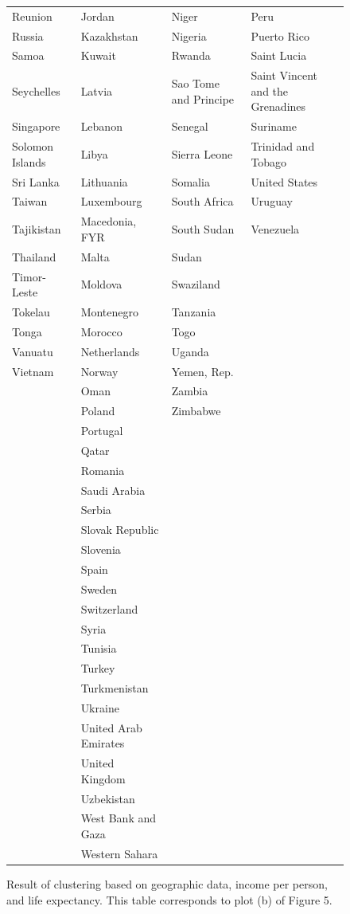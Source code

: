 \documentclass[11pt]{amsart}
\theoremstyle{remark}	  \newtheorem*{remark}{Remark}
\numberwithin{equation}{section}
\begin{document}
\begin{figure}[b]
\begin{tabular}{|l|l|l|l|}
Reunion&Jordan&Niger&Peru\\
Russia&Kazakhstan&Nigeria&Puerto Rico\\
Samoa&Kuwait&Rwanda&Saint Lucia\\
Seychelles&Latvia&Sao Tome and Principe&Saint Vincent and the Grenadines\\
Singapore&Lebanon&Senegal&Suriname\\
Solomon Islands&Libya&Sierra Leone&Trinidad and Tobago\\
Sri Lanka&Lithuania&Somalia&United States\\
Taiwan&Luxembourg&South Africa&Uruguay\\
Tajikistan&Macedonia, FYR&South Sudan&Venezuela\\
Thailand&Malta&Sudan&\\
Timor-Leste&Moldova&Swaziland&\\
Tokelau&Montenegro&Tanzania&\\
Tonga&Morocco&Togo&\\
Vanuatu&Netherlands&Uganda&\\
Vietnam&Norway&Yemen, Rep.&\\
&Oman&Zambia&\\
&Poland&Zimbabwe&\\
&Portugal&&\\
&Qatar&&\\
&Romania&&\\
&Saudi Arabia&&\\
&Serbia&&\\
&Slovak Republic&&\\
&Slovenia&&\\
&Spain&&\\
&Sweden&&\\
&Switzerland&&\\
&Syria&&\\
&Tunisia&&\\
&Turkey&&\\
&Turkmenistan&&\\
&Ukraine&&\\
&United Arab Emirates&&\\
&United Kingdom&&\\
&Uzbekistan&&\\
&West Bank and Gaza&&\\
&Western Sahara&&\\
\hline
\end{tabular}
\caption{Result of clustering based on geographic data, income per person, and life expectancy. This table corresponds to plot (b) of Figure 5.}
\end{figure} 
\end{document}
